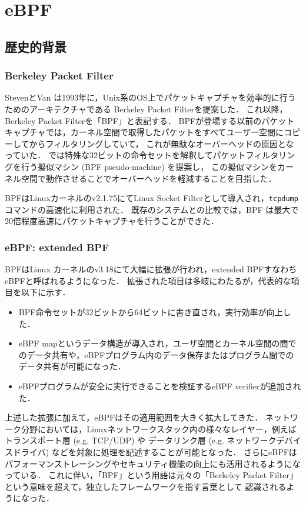 \chapter{eBPF}
\section{歴史的背景}
\subsection{Berkeley Packet Filter}
StevenとVan \cite{berkeley-packet-filter}は1993年に，Unix系のOS上でパケットキャプチャを効率的に行うためのアーキテクチャである
Berkeley Packet Filterを提案した．
これ以降，Berkeley Packet Filterを「BPF」と表記する．
BPFが登場する以前のパケットキャプチャでは，カーネル空間で取得したパケットをすべてユーザー空間にコピーしてからフィルタリングしていて，
これが無駄なオーバーヘッドの原因となっていた．
\cite{berkeley-packet-filter}では特殊な32ビットの命令セットを解釈してパケットフィルタリングを行う擬似マシン (BPF pseudo-machine) を提案し，
この擬似マシンをカーネル空間で動作させることでオーバーヘッドを軽減することを目指した．

BPFはLinuxカーネルのv2.1.75にてLinux Socket Filterとして導入され，\texttt{tcpdump}コマンドの高速化に利用された．
既存のシステムとの比較では，BPF は最大で20倍程度高速にパケットキャプチャを行うことができた．

\subsection{eBPF: extended BPF}
BPFはLinux カーネルのv3.18にて大幅に拡張が行われ，extended BPFすなわちeBPFと呼ばれるようになった．
拡張された項目は多岐にわたるが，代表的な項目を以下に示す．
\begin{itemize}
  \item BPF命令セットが32ビットから64ビットに書き直され，実行効率が向上した．
  \item eBPF mapというデータ構造が導入され，ユーザ空間とカーネル空間の間でのデータ共有や，eBPFプログラム内のデータ保存またはプログラム間でのデータ共有が可能になった．
  \item eBPFプログラムが安全に実行できることを検証するeBPF verifierが追加された．
\end{itemize}

上述した拡張に加えて，eBPFはその適用範囲を大きく拡大してきた．
ネットワーク分野においては，Linuxネットワークスタック内の様々なレイヤー，例えばトランスポート層 (e.g. TCP/UDP) や
データリンク層 (e.g. ネットワークデバイスドライバ) などを対象に処理を記述することが可能となった．
さらにeBPFはパフォーマンストレーシングやセキュリティ機能の向上にも活用されるようになっている．
これに伴い，「BPF」という用語は元々の「Berkeley Packet Filter」という意味を超えて，独立したフレームワークを指す言葉として
認識されるようになった．

